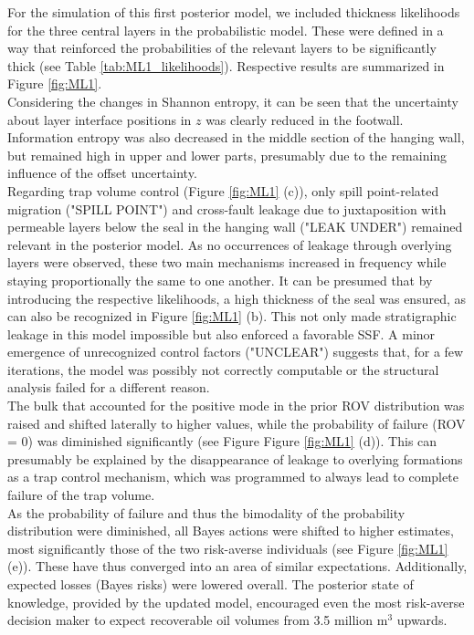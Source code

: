 		For the simulation of this first posterior model, we included thickness likelihoods for the three central layers in the probabilistic model. These were defined in a way that reinforced the probabilities of the relevant layers to be significantly thick (see Table \ref{tab:ML1_likelihoods}). Respective results are summarized in Figure \ref{fig:ML1}.\\
		Considering the changes in Shannon entropy, it can be seen that the uncertainty about layer interface positions in $z$ was clearly reduced in the footwall. Information entropy was also decreased in the middle section of the hanging wall, but remained high in upper and lower parts, presumably due to the remaining influence of the offset uncertainty.\\
		Regarding trap volume control (Figure \ref{fig:ML1} (c)), only spill point-related migration ("SPILL POINT") and cross-fault leakage due to juxtaposition with permeable layers below the seal in the hanging wall ("LEAK UNDER") remained relevant in the posterior model. As no occurrences of leakage through overlying layers were observed, these two main mechanisms increased in frequency while staying proportionally the same to one another. It can be presumed that by introducing the respective likelihoods, a high thickness of the seal was ensured, as can also be recognized in Figure \ref{fig:ML1} (b). This not only made stratigraphic leakage in this model impossible but also enforced a favorable SSF. A minor emergence of unrecognized control factors ("UNCLEAR") suggests that, for a few iterations, the model was possibly not correctly computable or the structural analysis failed for a different reason.\\
		The bulk that accounted for the positive mode in the prior ROV distribution was raised and shifted laterally to higher values, while the probability of failure (ROV = 0) was diminished significantly (see Figure Figure \ref{fig:ML1} (d)). This can presumably be explained by the disappearance of leakage to overlying formations as a trap control mechanism, which was programmed to always lead to complete failure of the trap volume.\\
		As the probability of failure and thus the bimodality of the probability distribution were diminished, all Bayes actions were shifted to higher estimates, most significantly those of the two risk-averse individuals (see Figure \ref{fig:ML1} (e)). These have thus converged into an area of similar expectations. Additionally, expected losses (Bayes risks) were lowered overall. The posterior state of knowledge, provided by the updated model, encouraged even the most risk-averse decision maker to expect recoverable oil volumes from 3.5 million m$^3$ upwards.
		
